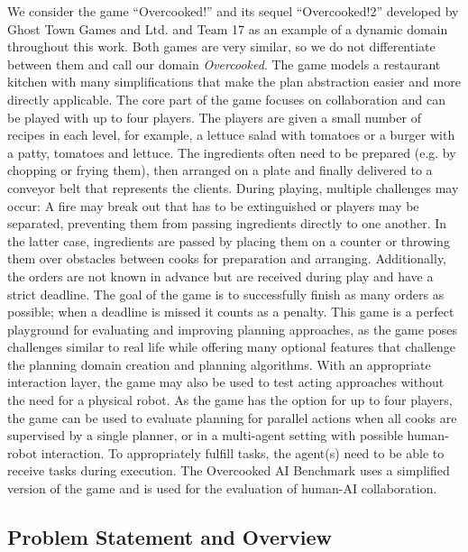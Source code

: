 We consider the game ``Overcooked!'' and its sequel ``Overcooked!2'' developed by Ghost Town Games and Ltd. and Team 17 as an example of a dynamic domain throughout this work.
Both games are very similar, so we do not differentiate between them and call our domain \textit{Overcooked}.
The game models a restaurant kitchen with many simplifications that make the plan abstraction easier and more directly applicable.
The core part of the game focuses on collaboration and can be played with up to four players.
The players are given a small number of recipes in each level, for example, a lettuce salad with tomatoes or a burger with a patty, tomatoes and lettuce.
The ingredients often need to be prepared (e.g. by chopping or frying them), then arranged on a plate and finally delivered to a conveyor belt that represents the clients.
During playing, multiple challenges may occur: A fire may break out that has to be extinguished or players may be separated, preventing them from passing ingredients directly to one another.
In the latter case, ingredients are passed by placing them on a counter or throwing them over obstacles between cooks for preparation and arranging.
Additionally, the orders are not known in advance but are received during play and have a strict deadline.
The goal of the game is to successfully finish as many orders as possible; when a deadline is missed it counts as a penalty.
This game is a perfect playground for evaluating and improving planning approaches, as the game poses challenges similar to real life while offering many optional features that challenge the planning domain creation and planning algorithms.
With an appropriate interaction layer, the game may also be used to test acting approaches without the need for a physical robot.
As the game has the option for up to four players, the game can be used to evaluate planning for parallel actions when all cooks are supervised by a single planner, or in a multi-agent setting with possible human-robot interaction. 
To appropriately fulfill tasks, the agent(s) need to be able to receive tasks during execution.
The Overcooked \ac{AI} Benchmark \citep{carrollUtilityLearningHumans2019} uses a simplified version of the game and is used for the evaluation of human-\ac{AI} collaboration.

\subsection{Problem Statement and Overview}
\label{sec:introduction-problem}


